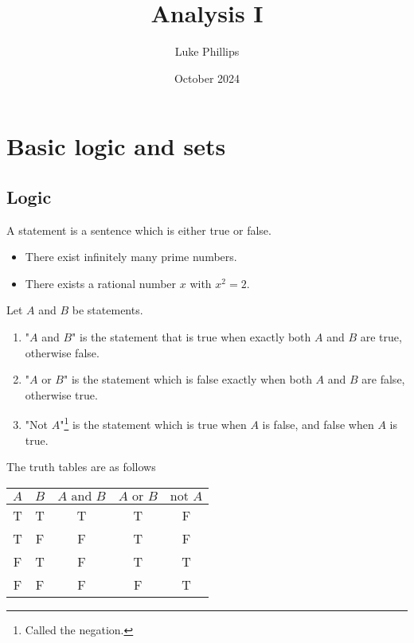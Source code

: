 \documentclass[10pt, a4paper]{article}
\title{Analysis I}
\author{Luke Phillips}
\date{October 2024}
\begin{document}
\maketitle

\newpage

\tableofcontents

\newpage

\section{Basic logic and sets}

\subsection{Logic}
\begin{definition}
    A statement is a sentence which is either true or false.
\end{definition}
\begin{example}
    \phantom{}
    \begin{itemize}
        \item There exist infinitely many prime numbers.
        \item There exists a rational number $x$ with $x ^ 2 = 2$.
    \end{itemize}
\end{example}

\begin{definition}
    Let $A$ and $B$ be statements.
    \begin{enumerate}[label = (\alph*)]
        \item "$A$ and $B$" is the statement that is true when exactly both $A$ and $B$ are true, otherwise false.
        \item "$A$ or $B$" is the statement which is false exactly when both $A$ and $B$ are false, otherwise true.
        \item "Not $A$"\footnote{Called the negation.} is the statement which is true when $A$ is false, and false when $A$ is true.
    \end{enumerate}

    The truth tables are as follows 
    \begin{table}[H]
        \centering
        \begin{tabular}{|c|c|c|c|c|}
            \hline
            $A$ & $B$ & $A \text{ and } B$ & $A \text{ or } B$ & $\text{not } A$ \\
            \hline
            T & T & T & T & F \\
            T & F & F & T & F \\
            F & T & F & T & T \\
            F & F & F & F & T \\
            \hline
        \end{tabular}
        \label{tab:Gr6}
    \end{table}
\end{definition}
\end{document}
